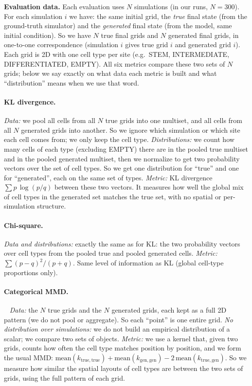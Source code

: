 \documentclass[11pt,a4paper]{article}
\begin{document}
\textbf{Evaluation data.} Each evaluation uses \(N\) simulations (in our runs, \(N=300\)). For each simulation \(i\) we have: the same initial grid, the \emph{true} final state (from the ground-truth simulator) and the \emph{generated} final state (from the model, same initial condition). So we have \(N\) true final grids and \(N\) generated final grids, in one-to-one correspondence (simulation \(i\) gives true grid \(i\) and generated grid \(i\)). Each grid is 2D with one cell type per site (e.g.\ STEM, INTERMEDIATE, DIFFERENTIATED, EMPTY). All six metrics compare these two sets of \(N\) grids; below we say exactly on what data each metric is built and what ``distribution'' means when we use that word.

\paragraph{KL divergence.} \emph{Data:} we pool all cells from all \(N\) true grids into one multiset, and all cells from all \(N\) generated grids into another. So we ignore which simulation or which site each cell comes from; we only keep the cell type. \emph{Distributions:} we count how many cells of each type (excluding EMPTY) there are in the pooled true multiset and in the pooled generated multiset, then we normalize to get two probability vectors over the set of cell types. So we get one distribution for ``true'' and one for ``generated'', each on the same set of types. \emph{Metric:} KL divergence \(\sum p\,\log(p/q)\) between these two vectors. It measures how well the global mix of cell types in the generated set matches the true set, with no spatial or per-simulation structure.

\paragraph{Chi-square.} \emph{Data and distributions:} exactly the same as for KL: the two probability vectors over cell types from the pooled true and pooled generated cells. \emph{Metric:} \(\sum (p-q)^2/(p+q)\). Same level of information as KL (global cell-type proportions only).

\paragraph{Categorical MMD.}~\cite{gretton2012mmd} \emph{Data:} the \(N\) true grids and the \(N\) generated grids, each kept as a full 2D pattern (we do not pool or aggregate). So each ``point'' is one entire grid. \emph{No distribution over simulations:} we do not build an empirical distribution of a scalar; we compare two sets of objects. \emph{Metric:} we use a kernel that, given two grids, counts how often the cell type matches position by position, and we form the usual MMD: \(\mathrm{mean}(k_{\mathrm{true,true}}) + \mathrm{mean}(k_{\mathrm{gen,gen}}) - 2\,\mathrm{mean}(k_{\mathrm{true,gen}})\). So we measure how similar the spatial layouts of cell types are between the two sets of grids, using the full pattern of each grid.
\end{document}
